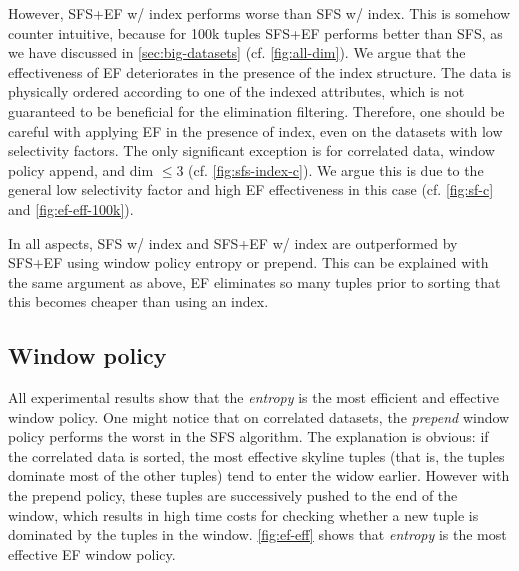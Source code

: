However, SFS+EF w/ index performs worse than SFS w/ index.  This is
somehow counter intuitive, because for 100k tuples SFS+EF performs
better than SFS, as we have discussed in
\autoref{sec:big-datasets} (cf. \autoref{fig:all-dim}).  We
argue that the effectiveness of EF deteriorates in the presence of
the index structure.  The data is physically ordered according to one
of the indexed attributes, which is not guaranteed to be beneficial
for the elimination filtering.  Therefore, one should be careful with
applying EF in the presence of index, even on the datasets with low
selectivity factors.
%
The only significant exception is for correlated data, window policy
append, and dim $\le 3$ (cf. \autoref{fig:sfs-index-c}).  We argue
this is due to the general low selectivity factor and high EF
effectiveness in this case (cf. \autoref{fig:sf-c} and
\ref{fig:ef-eff-100k}).

In all aspects, SFS w/ index and SFS+EF w/ index are outperformed by
SFS+EF using window policy entropy or prepend. This can be explained
with the same argument as above, EF eliminates so many tuples prior to
sorting that this becomes cheaper than using an index.

\subsection{Window policy}
All experimental results show that the \emph{entropy} is the most
efficient and effective window policy.  One might notice that on
correlated datasets, the \emph{prepend} window policy performs the
worst in the SFS algorithm.  The explanation is obvious: if the
correlated data is sorted, the most effective skyline tuples (that is,
the tuples dominate most of the other tuples) tend to enter the widow
earlier.  However with the prepend policy, these tuples are
successively pushed to the end of the window, which results in high
time costs for checking whether a new tuple is dominated by the tuples
in the window.  \autoref{fig:ef-eff} shows that \emph{entropy} is
the most effective EF window policy.

%
% 



